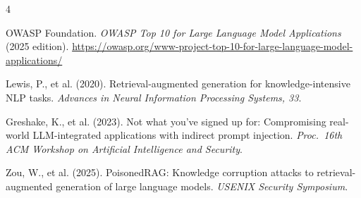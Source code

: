 \documentclass[11pt,a4paper]{article}
\begin{document}
\begin{thebibliography}{4}

OWASP Foundation.
\textit{OWASP Top 10 for Large Language Model Applications} (2025 edition).
\url{https://owasp.org/www-project-top-10-for-large-language-model-applications/}

Lewis, P., et al. (2020).
Retrieval-augmented generation for knowledge-intensive NLP tasks.
\textit{Advances in Neural Information Processing Systems, 33}.

Greshake, K., et al. (2023).
Not what you've signed up for: Compromising real-world LLM-integrated
applications with indirect prompt injection.
\textit{Proc.\ 16th ACM Workshop on Artificial Intelligence and Security}.

Zou, W., et al. (2025).
PoisonedRAG: Knowledge corruption attacks to retrieval-augmented generation
of large language models.
\textit{USENIX Security Symposium}.

\end{thebibliography}
\end{document}

